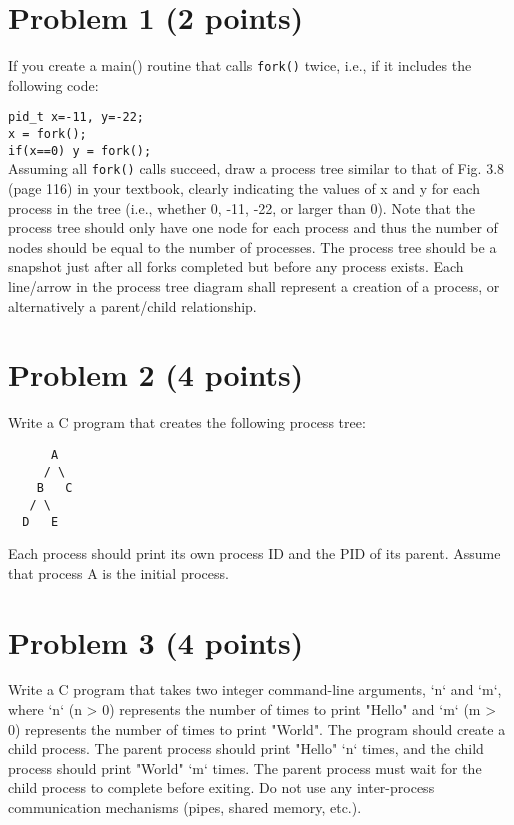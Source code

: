 \documentclass{article}
\begin{document}
\section*{Problem 1 (2 points)}

If you create a main() routine that calls \texttt{fork()} twice, i.e., if it includes the following code:

\texttt{pid\_t x=-11, y=-22;}\\
\texttt{x = fork();}\\
\texttt{if(x==0) y = fork();}\\

Assuming all \texttt{fork()} calls succeed, draw a process tree similar to that of Fig. 3.8 (page 116) in your textbook, clearly indicating the values of x and y for each process in the tree (i.e., whether 0, -11, -22, or larger than 0). Note that the process tree should only have one node for each process and thus the number of nodes should be equal to the number of processes. The process tree should be a snapshot just after all forks completed but before any process exists. Each line/arrow in the process tree diagram shall represent a creation of a process, or alternatively a parent/child relationship.


\section*{Problem 2 (4 points)}

Write a C program that creates the following process tree:

\begin{verbatim}
      A
     / \
    B   C
   / \
  D   E
\end{verbatim}

Each process should print its own process ID and the PID of its parent.  Assume that process A is the initial process.


\section*{Problem 3 (4 points)}

Write a C program that takes two integer command-line arguments,  `n` and `m`, where `n` (n > 0) represents the number of times to print "Hello" and `m` (m > 0) represents the number of times to print "World". The program should create a child process. The parent process should print "Hello" `n` times, and the child process should print "World" `m` times.  The parent process must wait for the child process to complete before exiting.  Do not use any inter-process communication mechanisms (pipes, shared memory, etc.).
\end{document}

